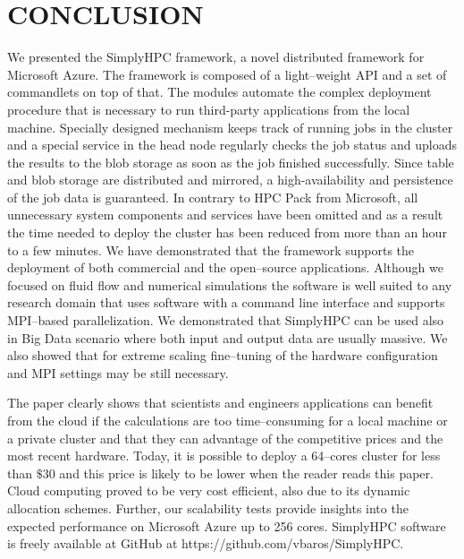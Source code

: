 \documentclass[a4paper,twoside]{article}
\begin{document}
 
\section{\uppercase{Conclusion}}
\label{sec:conclusions}

We presented the SimplyHPC framework, a novel distributed framework for Microsoft Azure. The framework is composed of a light--weight API and a set of commandlets on top of that. The modules automate the complex deployment procedure that is necessary to run third-party applications from the local machine. Specially designed mechanism keeps track of running jobs in the cluster and a special service in the head node regularly checks the job status and uploads the results to the blob storage as soon as the job finished successfully. Since table and blob storage are distributed and mirrored, a high-availability and persistence of the job data is guaranteed. In contrary to HPC Pack from Microsoft, all unnecessary system components and services have been omitted and as a result the time needed to deploy the cluster has been reduced from more than an hour to a few minutes.  We have demonstrated that the framework supports the deployment of both commercial and the open--source applications. Although we focused on fluid flow and numerical simulations the software is well suited to any research domain that uses software with a command line interface and supports MPI--based parallelization. We demonstrated that SimplyHPC can be used also in Big Data scenario where both input and output data are usually massive. We also showed that for extreme scaling fine--tuning of the hardware configuration and MPI settings may be still necessary.


The paper clearly shows that scientists and engineers applications can benefit from the cloud if the calculations are too time--consuming for a local machine or a private cluster and that they can advantage of the competitive prices and the most recent hardware. Today, it is possible to deploy a 64--cores cluster for less than $\$30$ and this price is likely to be lower when the reader reads this paper. Cloud computing proved to be very cost efficient, also due to its dynamic allocation schemes. %
Further, our scalability tests provide insights into the expected performance on Microsoft Azure up to 256 cores. SimplyHPC software is freely available at GitHub at https://github.com/vbaros/SimplyHPC.

 

{
}
\end{document}
